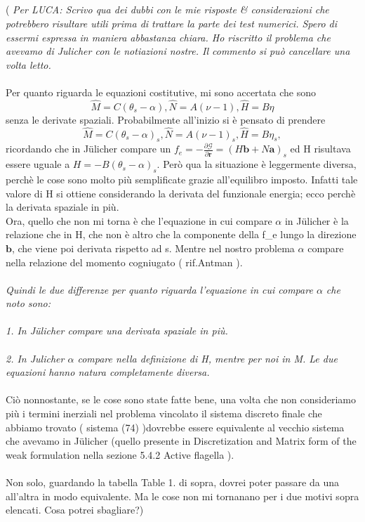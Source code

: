 \\\\\\\\
( \emph{Per LUCA: Scrivo qua dei dubbi con le mie risposte & considerazioni che potrebbero risultare utili prima di trattare la parte dei test numerici. Spero di essermi espressa in maniera abbastanza chiara. Ho riscritto il problema che avevamo di Julicher con le notiazioni nostre.
Il commento si può cancellare una volta letto.}
\\\\
Per quanto riguarda le equazioni costitutive, mi sono accertata che sono
\[ \hat{M} = C(\theta_s -\alpha), \hat{N} = A(\nu - 1), \hat{H} = B\eta \]
senza le derivate spaziali. Probabilmente all'inizio si è pensato di prendere 
\[ \hat{M} = C(\theta_s -\alpha)_s, \hat{N} = A(\nu - 1)_s, \hat{H} = B\eta _s, \] 
ricordando che in Jülicher compare un
$f_e = -\frac{\partial \mathcal{G}}{\partial \mathbf{r}} = (H \mathbf{b} + N \mathbf{a})_s$
ed H risultava essere uguale a $H = - B(\theta_s - \alpha)_s$. Però qua la situazione è leggermente diversa, perchè le cose sono molto più semplificate grazie all'equilibro imposto.
Infatti tale valore di H si ottiene considerando la derivata del funzionale energia; ecco perchè la derivata spaziale in più.\\
Ora, quello che non mi torna è che l'equazione in cui compare $\alpha$ in Jülicher è la relazione che in H, che non è altro che la componente della f_e lungo la direzione $\mathbf{b}$, che viene poi derivata rispetto ad s. Mentre nel nostro problema $\alpha$ compare nella relazione del momento cogniugato ( rif.Antman ).
\\\\
\emph{Quindi le due differenze per quanto riguarda l'equazione in cui compare $\alpha$ che noto sono:}
\\\\
\emph{1. In Jülicher compare una derivata spaziale in più.}
\\\\
\emph{2. In Julicher $\alpha$ compare nella definizione di H, mentre per noi in M. Le due equazioni hanno natura completamente diversa.}
\\\\
Ciò nonnostante, se le cose sono state fatte bene, una volta che non consideriamo più i termini inerziali nel problema vincolato il sistema discreto finale che abbiamo trovato ( sistema (74) )dovrebbe essere equivalente al vecchio sistema che avevamo in Jülicher (quello presente in Discretization and Matrix form of the weak formulation nella sezione 5.4.2 Active flagella ).
\\\\
Non solo, guardando la tabella Table 1. di sopra, dovrei poter passare da una all'altra in modo equivalente. Ma le cose non mi tornanano per i due motivi sopra elencati. Cosa potrei sbagliare?) 




